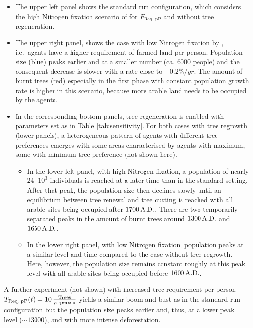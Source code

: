 \begin{itemize}
	\item The upper left panel shows the standard run configuration, which considers the high Nitrogen fixation scenario of \citet{Puleston2017} for $F_\text{Req, pP}$ and without tree regeneration.
	\item The upper right panel, shows the case with low Nitrogen fixation by \citet{Puleston2017}, i.e.\ agents have a higher requirement of farmed land per person.
	Population size (blue) peaks earlier and at a smaller number (ca. $6000$ people) and the consequent decrease is slower with a rate close to $-0.2\%/yr$.
	The amount of burnt trees (red) especially in the first phase with constant population growth rate is higher in this scenario, because more arable land needs to be occupied by the agents.
	\item In the corresponding bottom panels, tree regeneration is enabled with parameters set as in Table \ref{tab:sensitivity}. 
	For both cases with tree regrowth (lower panels), a heterogeneous pattern of agents with different tree preferences emerges with some areas characterised by agents with maximum, some with minimum tree preference (not shown here).
	\begin{itemize}
		\item In the lower left panel, with high Nitrogen fixation, a population of nearly $24\cdot10^3$ individuals is reached at a later time than in the standard setting. After that peak, the population size then declines slowly until an equilibrium between tree renewal and tree cutting is reached with all arable sites being occupied after $1700\, {\rm A.D.}$.
		There are two temporarily separated peaks in the amount of burnt trees around $1300\, {\rm A.D.}$ and $1650\, {\rm A.D.}$.
		\item In the lower right panel, with low Nitrogen fixation, population peaks at a similar level and time compared to the case without tree regrowth.
		Here, however, the population size remains constant roughly at this peak level with all arable sites being occupied before $1600\, {\rm A.D.}$.
	\end{itemize}

\end{itemize}
A further experiment (not shown) with increased tree requirement per person $T_\text{Req, pP}(t)=10\,{\rm \frac{Trees}{yr\cdot person}}$ yields a similar boom and bust as in the standard run configuration but the population size peaks earlier and, thus, at a lower peak level ($\sim 13000$), and with more intense deforestation.
 

